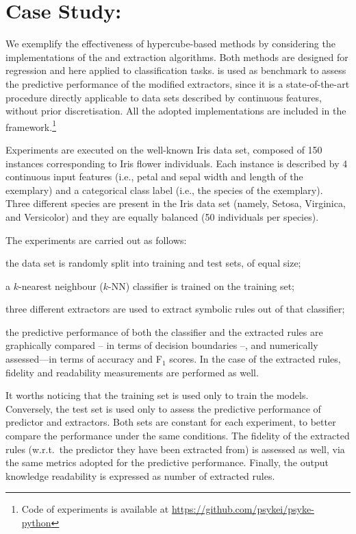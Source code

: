 \documentclass[
]{ceurart}
\begin{document}
\section{Case Study: \psyke}

We exemplify the effectiveness of hypercube-based methods by considering the implementations of the \iter{} and \gridex{} extraction algorithms.
%
Both methods are designed for regression and here applied to classification tasks.
%
\cart{} is used as benchmark to assess the predictive performance of the modified extractors, since it is a state-of-the-art procedure directly applicable to data sets described by continuous features, without prior discretisation.
%
All the adopted implementations are included in the \psyke{} framework.\footnote{Code of experiments is available at \url{https://github.com/psykei/psyke-python}}

Experiments are executed on the well-known Iris data set, composed of 150 instances corresponding to Iris flower individuals.
%
Each instance is described by 4 continuous input features (i.e., petal and sepal width and length of the exemplary) and a categorical class label (i.e., the species of the exemplary).
%
Three different species are present in the Iris data set (namely, Setosa, Virginica, and Versicolor) and they are equally balanced (50 individuals per species).

The experiments are carried out as follows:
%
\begin{inlinelist}
	\item the data set is randomly split into training and test sets, of equal size;
	\item a $k$-nearest neighbour ($k$-NN) classifier is trained on the training set;
	\item three different extractors are used to extract symbolic rules out of that classifier;
	\item the predictive performance of both the classifier and the extracted rules are graphically compared -- in terms of decision boundaries --, and numerically assessed---in terms of accuracy and F$_1$ scores. In the case of the extracted rules, fidelity and readability measurements are performed as well.
\end{inlinelist}
%
It worths noticing that the training set is used only to train the models.
%
Conversely, the test set is used only to assess the predictive performance of predictor and extractors.
%
Both sets are constant for each experiment, to better compare the performance under the same conditions.
%
The fidelity of the extracted rules (w.r.t.\ the predictor they have been extracted from) is assessed as well, via the same metrics adopted for the predictive performance.
%
Finally, the output knowledge readability is expressed as number of extracted rules.
\end{document}
